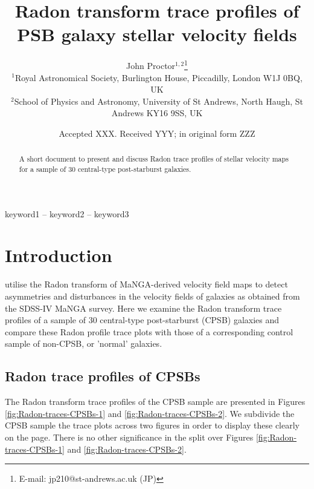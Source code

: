 \documentclass[fleqn,usenatbib]{mnras}
\title[Radon trace profiles of PSB galaxies]{Radon transform trace profiles of PSB galaxy stellar velocity fields}
\author[John Proctor]{
John Proctor$^{1,2}$\thanks{E-mail: jp210@st-andrews.ac.uk (JP)}
\\
$^{1}$Royal Astronomical Society, Burlington House, Piccadilly, London W1J 0BQ, UK\\
$^{2}$School of Physics and Astronomy, University of St Andrews, North Haugh, St Andrews KY16 9SS, UK\\
}
\date{Accepted XXX. Received YYY; in original form ZZZ}
\begin{document}
\label{firstpage}
\pagerange{\pageref{firstpage}--\pageref{lastpage}}
\maketitle

\begin{abstract}
A short document to present and discuss Radon trace profiles of stellar velocity maps for a sample of 30 central-type post-starburst galaxies. 
\end{abstract}

\begin{keywords}
keyword1 -- keyword2 -- keyword3
\end{keywords}


\section{Introduction}
\label{sec:Introduction}

\citet{2018MNRAS.480.2217S} utilise the Radon transform of MaNGA-derived velocity field maps to detect asymmetries and disturbances in the velocity fields of galaxies as obtained from the SDSS-IV MaNGA survey. Here we examine the Radon transform trace profiles of a sample of 30 central-type post-starburst (CPSB) galaxies and compare these Radon profile trace plots with those of a corresponding control sample of non-CPSB, or 'normal' galaxies.

\subsection{Radon trace profiles of CPSBs}
\label{sec:Radon_trace_profiles}

The Radon transform trace profiles of the CPSB sample are presented in Figures \ref{fig:Radon-traces-CPSBs-1} and \ref{fig:Radon-traces-CPSBs-2}. We subdivide the CPSB sample the trace plots across two figures in order to display these clearly on the page. There is no other significance in the split over Figures \ref{fig:Radon-traces-CPSBs-1} and \ref{fig:Radon-traces-CPSBs-2}.
\end{document}
